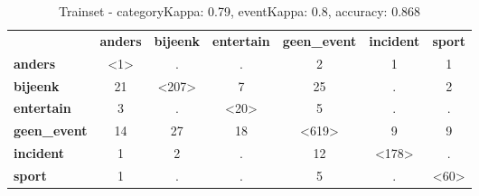 {{\begin{table}[H]
\centering
\begin{tabular}{lcccccc}
 & \multicolumn{1}{l}{\textbf{anders}} & \multicolumn{1}{l}{\textbf{bijeenk}} & \multicolumn{1}{l}{\textbf{entertain}} & \multicolumn{1}{l}{\textbf{geen\_event}} & \multicolumn{1}{l}{\textbf{incident}} & \multicolumn{1}{l}{\textbf{sport}} \\ \cline{2-7} 
\multicolumn{1}{l|}{\textbf{anders}} & \multicolumn{1}{c|}{\textless1\textgreater} & \multicolumn{1}{c|}{.} & \multicolumn{1}{c|}{.} & \multicolumn{1}{c|}{2} & \multicolumn{1}{c|}{1} & \multicolumn{1}{c|}{1} \\ \cline{2-7} 
\multicolumn{1}{l|}{\textbf{bijeenk}} & \multicolumn{1}{c|}{21} & \multicolumn{1}{c|}{\textless207\textgreater} & \multicolumn{1}{c|}{7} & \multicolumn{1}{c|}{25} & \multicolumn{1}{c|}{.} & \multicolumn{1}{c|}{2} \\ \cline{2-7} 
\multicolumn{1}{l|}{\textbf{entertain}} & \multicolumn{1}{c|}{3} & \multicolumn{1}{c|}{.} & \multicolumn{1}{c|}{\textless20\textgreater} & \multicolumn{1}{c|}{5} & \multicolumn{1}{c|}{.} & \multicolumn{1}{c|}{.} \\ \cline{2-7} 
\multicolumn{1}{l|}{\textbf{geen\_event}} & \multicolumn{1}{c|}{14} & \multicolumn{1}{c|}{27} & \multicolumn{1}{c|}{18} & \multicolumn{1}{c|}{\textless619\textgreater} & \multicolumn{1}{c|}{9} & \multicolumn{1}{c|}{9} \\ \cline{2-7} 
\multicolumn{1}{l|}{\textbf{incident}} & \multicolumn{1}{c|}{1} & \multicolumn{1}{c|}{2} & \multicolumn{1}{c|}{.} & \multicolumn{1}{c|}{12} & \multicolumn{1}{c|}{\textless178\textgreater} & \multicolumn{1}{c|}{.} \\ \cline{2-7} 
\multicolumn{1}{l|}{\textbf{sport}} & \multicolumn{1}{c|}{1} & \multicolumn{1}{c|}{.} & \multicolumn{1}{c|}{.} & \multicolumn{1}{c|}{5} & \multicolumn{1}{c|}{.} & \multicolumn{1}{c|}{\textless60\textgreater} \\ \cline{2-7} 
\end{tabular}
\caption{Trainset - categoryKappa: 0.79, eventKappa: 0.8, accuracy: 0.868}\label{annotationtrain}
\end{table}

}}
